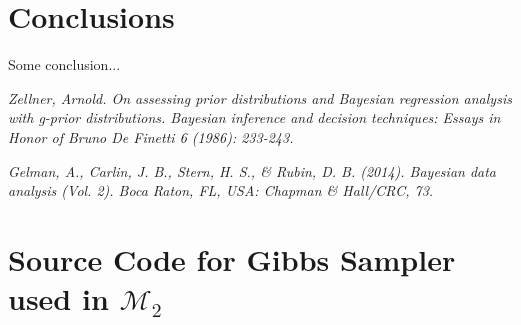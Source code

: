 \documentclass{../../tex_template/asaproc}
\newcommand{\M}{\mathcal{M}}
\begin{document}
\section{Conclusions}
Some conclusion...

\begin{references}
{\footnotesize
\itemsep=3pt
\item {\em Zellner, Arnold. On assessing prior distributions and Bayesian regression analysis with g-prior distributions. Bayesian inference and decision techniques: Essays in Honor of Bruno De Finetti 6 (1986): 233-243.}
\item {\em Gelman, A., Carlin, J. B., Stern, H. S., \& Rubin, D. B. (2014). Bayesian data analysis (Vol. 2). Boca Raton, FL, USA: Chapman \& Hall/CRC, 73.}
}
\end{references}

\newpage
\section{Source Code for Gibbs Sampler used in $\M_2$}

\end{document}
